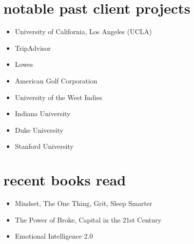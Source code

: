 \documentclass[]{friggeri-cv} %
\begin{document}
\section{notable past client projects}
\begin{itemize}
	\item University of California, Los Angeles (UCLA)
    \item TripAdvisor
    \item Lowes
    \item American Golf Corporation
    \item University of the West Indies
    \item Indiana University
    \item Duke University
    \item Stanford University
\end{itemize}

\section{recent books read}
\begin{itemize}
	\item Mindset, The One Thing, Grit, Sleep Smarter
    \item The Power of Broke, Capital in the 21st Century
    \item Emotional Intelligence 2.0
\end{itemize}





\end{document}
